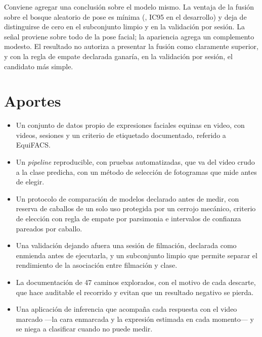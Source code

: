 Conviene agregar una conclusión sobre el modelo mismo. La ventaja de la fusión sobre el bosque aleatorio de pose es mínima (\DifFusionRFDev{}, IC95 \DifFusionRFDevIC{} en el desarrollo) y deja de distinguirse de cero en el subconjunto limpio y en la validación por sesión. La señal proviene sobre todo de la pose facial; la apariencia agrega un complemento modesto. El resultado no autoriza a presentar la fusión como claramente superior, y con la regla de empate declarada ganaría, en la validación por sesión, el candidato más simple.

\section{Aportes}
\begin{itemize}
  \item Un conjunto de datos propio de expresiones faciales equinas en video, con \VideosTotal{} videos, \SesionesTotal{} sesiones y un criterio de etiquetado documentado, referido a EquiFACS.
  \item Un \textit{pipeline} reproducible, con pruebas automatizadas, que va del video crudo a la clase predicha, con un método de selección de fotogramas que mide antes de elegir.
  \item Un protocolo de comparación de modelos declarado antes de medir, con reserva de caballos de un solo uso protegida por un cerrojo mecánico, criterio de elección con regla de empate por parsimonia e intervalos de confianza pareados por caballo.
  \item Una validación dejando afuera una sesión de filmación, declarada como enmienda antes de ejecutarla, y un subconjunto limpio que permite separar el rendimiento de la asociación entre filmación y clase.
  \item La documentación de 47 caminos explorados, con el motivo de cada descarte, que hace auditable el recorrido y evitan que un resultado negativo se pierda.
  \item Una aplicación de inferencia que acompaña cada respuesta con el video marcado ---la cara enmarcada y la expresión estimada en cada momento--- y se niega a clasificar cuando no puede medir.
\end{itemize}

